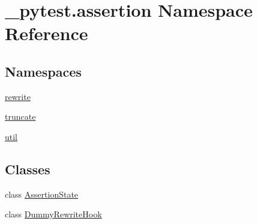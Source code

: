 \hypertarget{namespace__pytest_1_1assertion}{}\section{\+\_\+pytest.\+assertion Namespace Reference}
\label{namespace__pytest_1_1assertion}
\subsection*{Namespaces}
\begin{DoxyCompactItemize}
\item 
 \hyperlink{namespace__pytest_1_1assertion_1_1rewrite}{rewrite}
\item 
 \hyperlink{namespace__pytest_1_1assertion_1_1truncate}{truncate}
\item 
 \hyperlink{namespace__pytest_1_1assertion_1_1util}{util}
\end{DoxyCompactItemize}
\subsection*{Classes}
\begin{DoxyCompactItemize}
\item 
class \hyperlink{class__pytest_1_1assertion_1_1_assertion_state}{Assertion\+State}
\item 
class \hyperlink{class__pytest_1_1assertion_1_1_dummy_rewrite_hook}{Dummy\+Rewrite\+Hook}
\end{DoxyCompactItemize}
